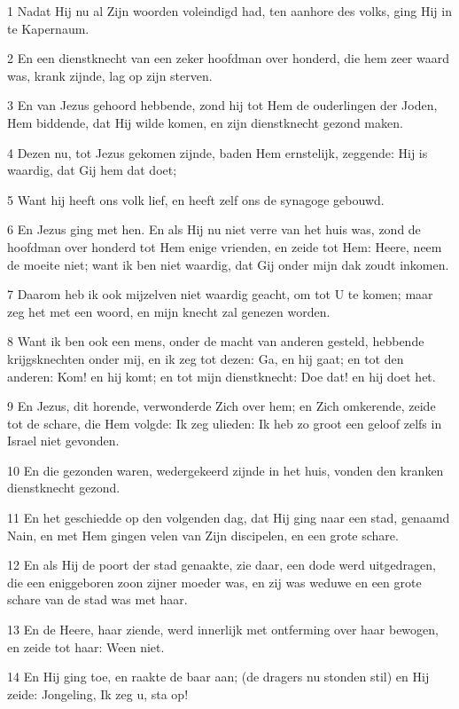 \par 1 Nadat Hij nu al Zijn woorden voleindigd had, ten aanhore des volks, ging Hij in te Kapernaum.
\par 2 En een dienstknecht van een zeker hoofdman over honderd, die hem zeer waard was, krank zijnde, lag op zijn sterven.
\par 3 En van Jezus gehoord hebbende, zond hij tot Hem de ouderlingen der Joden, Hem biddende, dat Hij wilde komen, en zijn dienstknecht gezond maken.
\par 4 Dezen nu, tot Jezus gekomen zijnde, baden Hem ernstelijk, zeggende: Hij is waardig, dat Gij hem dat doet;
\par 5 Want hij heeft ons volk lief, en heeft zelf ons de synagoge gebouwd.
\par 6 En Jezus ging met hen. En als Hij nu niet verre van het huis was, zond de hoofdman over honderd tot Hem enige vrienden, en zeide tot Hem: Heere, neem de moeite niet; want ik ben niet waardig, dat Gij onder mijn dak zoudt inkomen.
\par 7 Daarom heb ik ook mijzelven niet waardig geacht, om tot U te komen; maar zeg het met een woord, en mijn knecht zal genezen worden.
\par 8 Want ik ben ook een mens, onder de macht van anderen gesteld, hebbende krijgsknechten onder mij, en ik zeg tot dezen: Ga, en hij gaat; en tot den anderen: Kom! en hij komt; en tot mijn dienstknecht: Doe dat! en hij doet het.
\par 9 En Jezus, dit horende, verwonderde Zich over hem; en Zich omkerende, zeide tot de schare, die Hem volgde: Ik zeg ulieden: Ik heb zo groot een geloof zelfs in Israel niet gevonden.
\par 10 En die gezonden waren, wedergekeerd zijnde in het huis, vonden den kranken dienstknecht gezond.
\par 11 En het geschiedde op den volgenden dag, dat Hij ging naar een stad, genaamd Nain, en met Hem gingen velen van Zijn discipelen, en een grote schare.
\par 12 En als Hij de poort der stad genaakte, zie daar, een dode werd uitgedragen, die een eniggeboren zoon zijner moeder was, en zij was weduwe en een grote schare van de stad was met haar.
\par 13 En de Heere, haar ziende, werd innerlijk met ontferming over haar bewogen, en zeide tot haar: Ween niet.
\par 14 En Hij ging toe, en raakte de baar aan; (de dragers nu stonden stil) en Hij zeide: Jongeling, Ik zeg u, sta op!
